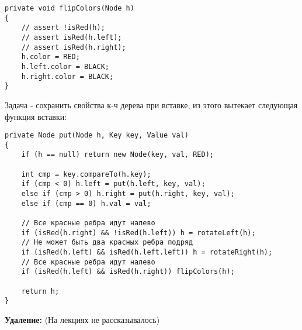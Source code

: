 \begin{verbatim}
private void flipColors(Node h)
{
    // assert !isRed(h);
    // assert isRed(h.left);
    // assert isRed(h.right);
    h.color = RED;
    h.left.color = BLACK;
    h.right.color = BLACK;
}
\end{verbatim}

Задача - сохранить свойства к-ч дерева при вставке, из этого вытекает следующая функция вставки:

\begin{verbatim}
private Node put(Node h, Key key, Value val)
{
    if (h == null) return new Node(key, val, RED);
    
    int cmp = key.compareTo(h.key);
    if (cmp < 0) h.left = put(h.left, key, val);
    else if (cmp > 0) h.right = put(h.right, key, val);
    else if (cmp == 0) h.val = val;
    
    // Все красные ребра идут налево
    if (isRed(h.right) && !isRed(h.left)) h = rotateLeft(h);
    // Не может быть два красных ребра подряд     
    if (isRed(h.left) && isRed(h.left.left)) h = rotateRight(h);
    // Все красные ребра идут налево 
    if (isRed(h.left) && isRed(h.right)) flipColors(h);          
    
    return h;
}
\end{verbatim}

{\bf Удаление:} (На лекциях не рассказывалось)

